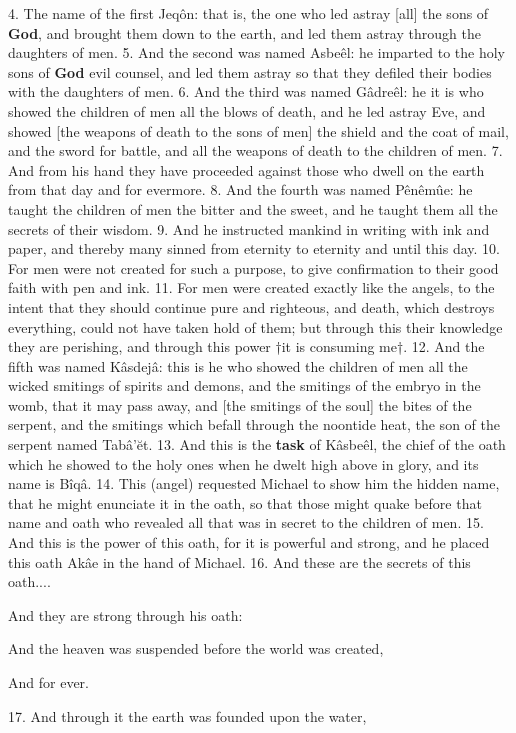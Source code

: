 4. The name of the first Jeqôn: that is, the one
who led astray [all] the sons of \textbf{God}, and brought
them down to the earth, and led them astray through
the daughters of men. 5. And the second was named
Asbeêl: he imparted to the holy sons of \textbf{God} evil
counsel, and led them astray so that they defiled
their bodies with the daughters of men. 6. And the
third was named Gâdreêl: he it is who showed the
children of men all the blows of death, and he led
astray Eve, and showed [the weapons of death to the
sons of men] the shield and the coat of mail, and the
sword for battle, and all the weapons of death to the
children of men. 7. And from his hand they have
proceeded against those who dwell on the earth from
that day and for evermore. 8. And the fourth was
named Pênêmûe: he taught the children of men the
bitter and the sweet, and he taught them all the
secrets of their wisdom. 9. And he instructed mankind
in writing with ink and paper, and thereby many
sinned from eternity to eternity and until this day.
10. For men were not created for such a purpose, to
give confirmation to their good faith with pen and
ink. 11. For men were created exactly like the
angels, to the intent that they should continue pure
and righteous, and death, which destroys everything,
could not have taken hold of them; but through
this their knowledge they are perishing, and through
this power †it is consuming me†. 12. And the fifth
was named Kâsdejâ: this is he who showed the
children of men all the wicked smitings of spirits and
demons, and the smitings of the embryo in the womb,
that it may pass away, and [the smitings of the soul]
the bites of the serpent, and the smitings which befall
through the noontide heat, the son of the serpent
named Tabâ’ĕt. 13. And this is the \textbf{task} of Kâsbeêl,
the chief of the oath which he showed to the holy ones
when he dwelt high above in glory, and its name
is Bîqâ. 14. This (angel) requested Michael to show
him the hidden name, that he might enunciate it in
the oath, so that those might quake before that name
and oath who revealed all that was in secret to the
children of men. 15. And this is the power of this
oath, for it is powerful and strong, and he placed
this oath Akâe in the hand of Michael. 16. And
these are the secrets of this oath....

And they are strong through his oath:

And the heaven was suspended before the world was created,

And for ever.

17. And through it the earth was founded upon the water,

